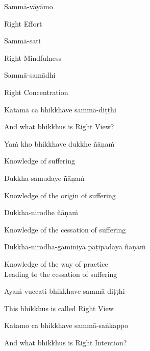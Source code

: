 \ifninebythirteen\clearpage\fi

Sammā-vāyāmo

\begin{english}
  Right Effort
\end{english}

Sammā-sati

\begin{english}
  Right Mindfulness
\end{english}

Sammā-samādhi

\begin{english}
  Right Concentration
\end{english}

Katamā ca bhikkhave sammā-diṭṭhi

\begin{english}
  And what bhikkhus is Right View?
\end{english}

Yaṁ kho bhikkhave dukkhe ñāṇaṁ

\begin{english}
  Knowledge of suffering
\end{english}

Dukkha-samudaye ñāṇaṁ

\begin{english}
  Knowledge of the origin of suffering
\end{english}

Dukkha-nirodhe ñāṇaṁ

\begin{english}
  Knowledge of the cessation of suffering
\end{english}

Dukkha-nirodha-gāminiyā paṭipadāya ñāṇaṁ

\begin{english}
  Knowledge of the way of practice\\
  Leading to the cessation of suffering
\end{english}

Ayaṁ vuccati bhikkhave sammā-diṭṭhi

\begin{english}
  This bhikkhus is called Right View
\end{english}

\ifninebythirteen\clearpage\fi

Katamo ca bhikkhave sammā-saṅkappo

\begin{english}
  And what bhikkhus is Right Intention?
\end{english}

